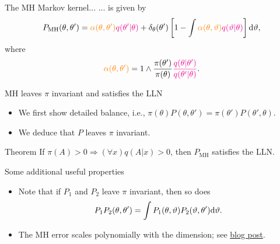 \documentclass[10pt]{beamer}
\let\oldcitep=\citep
\renewcommand\citep[1]{\hyperlink{#1}{\textcolor{vert}{\oldcitep{#1}}}}
\renewcommand\un[1]{\textcolor{magenta}{#1}}
\newcommand\unnnn[1]{\textcolor{orange}{#1}}
\def\blank{\vspace{.5\textheight}}
\begin{document}
\begin{frame}{The MH Markov kernel...}
... is given by
  $$
P_{\text{MH}}(\theta,\theta') = \unnnn{\alpha(\theta,\theta')} \un{q(\theta'\vert\theta)} + \delta_\theta(\theta')\left[1-\int \unnnn{\alpha(\theta,\vartheta)}\un{q(\vartheta\vert\theta)}\right]\d\vartheta,
$$
where
$$
\unnnn{\alpha(\theta,\theta')} = 1\wedge \frac{\pi(\theta')}{\pi(\theta)} \un{\frac{q(\theta\vert\theta')}{q(\theta'\vert\theta)}}.
$$
\blank
\end{frame}

\begin{frame}{MH leaves $\pi$ invariant and satisfies the LLN}
\begin{itemize}
  \item We first show detailed balance, i.e., $\pi(\theta)P(\theta,\theta') = \pi(\theta')P(\theta',\theta).$
  \vfill
  \vfill
  \vfill
  \vfill
  \item We deduce that $P$ leaves $\pi$ invariant.
  \vfill
  \vfill
  \vfill
  \vfill
\end{itemize}
\vfill
\begin{block}{Theorem \citep{RoCa04}}
  If $\pi(A)>0\Rightarrow (\forall x) q(A\vert x)>0$, then $P_{\text{MH}}$ satisfies the LLN.
\end{block}
\begin{exampleblock}{Some additional useful properties}
  \begin{itemize}
    \item Note that if $P_1$ and $P_2$ leave $\pi$ invariant, then so does
    $$
    P_1P_2 (\theta,\theta') = \int P_1(\theta,\vartheta)P_2(\vartheta,\theta'){\rm d}\vartheta.
    $$
    \item The MH error scales polynomially with the dimension; see \href{https://statisfaction.wordpress.com/2018/05/15/scaling-of-mcmc-with-dimension-experiments/}{blog post}.
  \end{itemize}
\end{exampleblock}
\end{frame}
\end{document}
